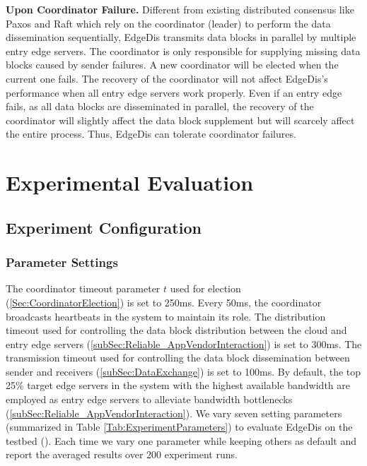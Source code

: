 \documentclass[10pt,journal,compsoc]{IEEEtran}
\begin{document}
\smallskip
\textbf{Upon Coordinator Failure.} Different from existing distributed consensus like Paxos \cite{lamport2001paxos} and Raft \cite{ongaro2014Raft}  which rely on the coordinator (leader) to perform the data dissemination sequentially, EdgeDis transmits data blocks in parallel by multiple entry edge servers. The coordinator is only responsible for supplying missing data blocks caused by sender failures. A new coordinator will be elected when the current one fails. The recovery of the coordinator will not affect EdgeDis's performance when all entry edge servers work properly. Even if an entry edge fails, as all data blocks are disseminated in parallel, the recovery of the coordinator will slightly affect the data block supplement but will scarcely affect the entire process. Thus, EdgeDis can tolerate coordinator failures. 
 
 
 

%
\section{Experimental Evaluation}
\label{Sec:Experiments}
%


\subsection{Experiment Configuration}
\label{sec:experiment_configuration}

\subsubsection{Parameter Settings}
\label{subsubSec:Experimental_Settings}

The coordinator timeout parameter $t$ used for election (\cref{Sec:CoordinatorElection}) is set to 250ms. Every 50ms, the coordinator broadcasts heartbeats in the system to maintain its role. The distribution timeout used for controlling the data block distribution between the cloud and entry edge servers (\cref{subSec:Reliable_AppVendorInteraction}) is set to 300ms. The transmission timeout used for controlling the data block dissemination between sender and receivers (\cref{subSec:DataExchange}) is set to 100ms. By default, the top 25\% target edge servers in the system with the highest available bandwidth are employed as entry edge servers to alleviate bandwidth bottlenecks (\cref{subSec:Reliable_AppVendorInteraction}). We vary seven setting parameters (summarized in Table \ref{Tab:ExperimentParameters}) to evaluate EdgeDis on the testbed (). Each time we vary one parameter while keeping others as default and report the averaged results over 200 experiment runs.
\end{document}
